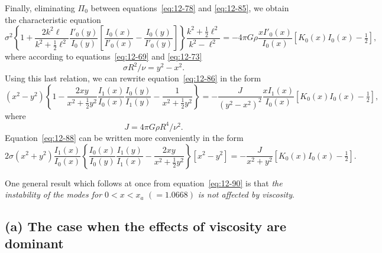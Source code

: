 Finally, eliminating $\Pi_0$ between equations~\eqref{eq:12-78} and \eqref{eq:12-85}, we obtain the characteristic equation
\begin{equation}
\label{eq:12-86}
\sigma^2 \left\{1 + \frac{2k^2\ell}{k^2+\frac{1}{2}\ell^2} \frac{I'_0(y)}{I_0(y)} \left[\frac{I_0(x)}{I'_0(x)} - \frac{I_0(y)}{I'_0(y)}\right]\right\} \frac{k^2+\frac{1}{2}\ell^2}{k^2-\ell^2} = -4\pi G\rho \frac{x I'_0(x)}{I_0(x)} [K_0(x)I_0(x)-\tfrac{1}{2}],
\end{equation}
where according to equations~\eqref{eq:12-69} and \eqref{eq:12-73}
\begin{equation}
\label{eq:12-87}
\sigma R^2/\nu = y^2 - x^2.
\end{equation}
Using this last relation, we can rewrite equation~\eqref{eq:12-86} in the form
\begin{equation}
\label{eq:12-88}
(x^2-y^2)\left\{1 - \frac{2xy}{x^2+\frac{1}{2}y^2} \frac{I_1(x)}{I_0(x)}\frac{I_0(y)}{I_1(y)} - \frac{1}{x^2+\frac{1}{2}y^2}\right\} = -\frac{J}{(y^2-x^2)^2} \frac{x I_1(x)}{I_0(x)} [K_0(x)I_0(x)-\tfrac{1}{2}],
\end{equation}
where
\begin{equation}
\label{eq:12-89}
J = 4\pi G\rho R^4/\nu^2.
\end{equation}
Equation~\eqref{eq:12-88} can be written more conveniently in the form
\begin{equation}
\label{eq:12-90}
2\sigma(x^2+y^2)\frac{I_1(x)}{I_0(x)}\left\{\frac{I_0(x)}{I_0(y)}\frac{I_1(y)}{I_1(x)} - \frac{2xy}{x^2+\frac{1}{2}y^2}\right\} [x^2-y^2] = -\frac{J}{x^2+y^2}[K_0(x)I_0(x)-\tfrac{1}{2}].
\end{equation}

One general result which follows at once from equation~\eqref{eq:12-90} is that \emph{the instability of the modes for $0 < x < x_a$} $(= 1.0668)$ \emph{is not affected by viscosity}.

\subsection*{(a) The case when the effects of viscosity are dominant}

